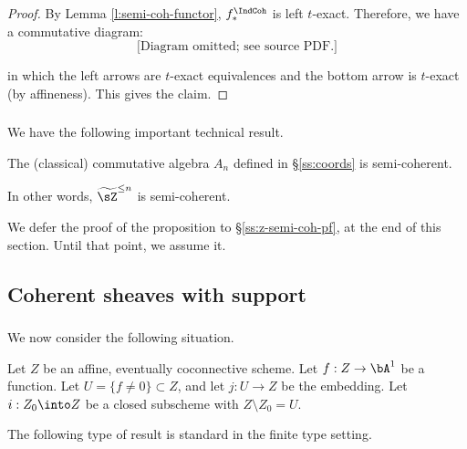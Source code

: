 \begin{proof}

By Lemma \ref{l:semi-coh-functor}, $f_*^{\IndCoh}$ is left $t$-exact.
Therefore, we have a commutative diagram:
%
\[
\text{[Diagram omitted; see source PDF.]}
\]

 in which the left arrows are $t$-exact equivalences and the
bottom arrow is $t$-exact (by affineness). This gives the claim.

\end{proof}

\subsubsection{}

We have the following important technical result.

\begin{prop}
\notready\label{p:semi-coh}

The (classical) commutative algebra $A_n$ defined in \S \ref{ss:coords} is
semi-coherent.

\end{prop}

In other words, $\widetilde{\sZ}^{\leq n}$ is semi-coherent.

We defer the proof of the proposition to \S \ref{ss:z-semi-coh-pf},
at the end of this section. Until that point, we assume it.

\subsection{Coherent sheaves with support}

\subsubsection{}

We now consider the following situation.

Let $Z$ be an affine, eventually coconnective scheme.
Let $f:Z \to \bA^1$ be a function. Let $U = \{f \neq 0\} \subset Z$,
and let $j:U \to Z$ be the embedding.
Let $i:Z_0 \into Z$ be a closed subscheme with
$Z \setminus Z_0 = U$.

The following type of result is standard in the finite type setting.

